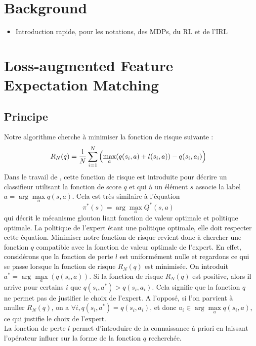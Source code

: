 \documentclass[publibook-draft]{CAp2012}
\begin{document}
\section{Background}
\label{back.sec}
\begin{itemize}
\item Introduction rapide, pour les notations, des MDPs, du RL et de l'IRL
\end{itemize}
\section{Loss-augmented Feature Expectation Matching}
\subsection{Principe}
Notre algorithme cherche à minimiser la fonction de risque suivante :
\begin{equation}
  R_N(q) = {1\over N} \sum_{i=1}^N\left(\max_{a}(q(s_i,a) + l(s_i,a)) - q(s_i,a_i) \right)
\end{equation}
Dans le travail de \citep{ratliff2007imitation}, cette fonction de risque est introduite pour décrire un classifieur utilisant la fonction de score $q$ et qui à un élément $s$ associe la label $a = \arg\max\limits_a q(s,a)$. Cela est très similaire à l'équation
  \begin{equation}
  \label{greedy.eqn}
  \pi^*(s) = \arg\max_{a} Q^*(s,a)
  \end{equation}
  qui décrit le mécanisme glouton liant fonction de valeur optimale et politique optimale. La politique de l'expert étant une politique optimale, elle doit respecter cette équation. Minimiser notre fonction de risque revient donc à chercher une fonction $q$ compatible avec la fonction de valeur optimale de l'expert. En effet, considérons que la fonction de perte $l$ est uniformément nulle et regardons ce qui se passe lorsque la fonction de risque $R_N(q)$ est minimisée. On introduit $a^* = \arg\max\limits_a(q(s_i,a))$. Si la fonction de risque $R_N(q)$ est positive, alors il arrive pour certains $i$ que $q(s_i,a^*) > q(s_i,a_i)$. Cela signifie que la fonction $q$ ne permet pas de justifier le choix de l'expert. A l'opposé, si l'on parvient à anuller $R_N(q)$, on a $\forall i, q(s_i,a^*) = q(s_i,a_i)$, et donc $a_i \in \arg\max\limits_a q(s_i,a)$, ce qui justifie le choix de l'expert.\\

   La fonction de perte $l$ permet d'introduire de la connaissance à priori en laissant l'opérateur influer sur la forme de la fonction $q$ recherchée.\\
\end{document}
